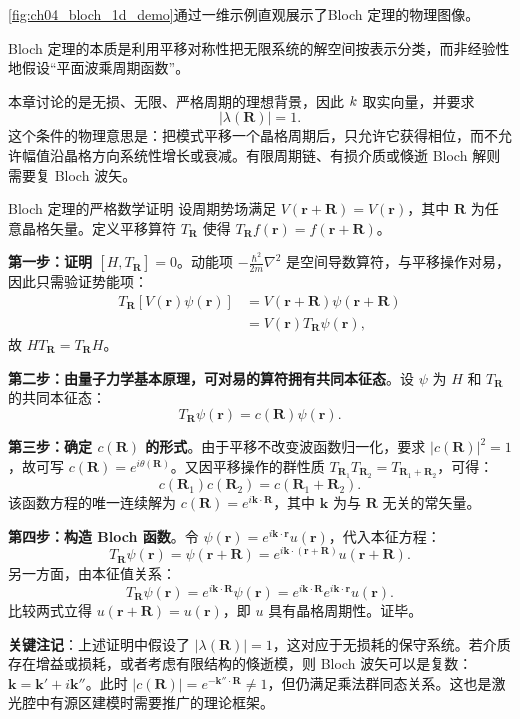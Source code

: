\cref{fig:ch04_bloch_1d_demo}通过一维示例直观展示了Bloch 定理的物理图像。

Bloch 定理的本质是利用平移对称性把无限系统的解空间按表示分类，而非经验性地假设“平面波乘周期函数”。

本章讨论的是无损、无限、严格周期的理想背景，因此 $k$ 取实向量，并要求
\[
|\lambda(\bm{R})|=1.
\]
这个条件的物理意思是：把模式平移一个晶格周期后，只允许它获得相位，而不允许幅值沿晶格方向系统性增长或衰减。有限周期链、有损介质或倏逝 Bloch 解则需要复 Bloch 波矢。

\begin{MathematicalFoundationBox}{Bloch 定理的严格数学证明}
设周期势场满足 $V(\mathbf{r}+\mathbf{R})=V(\mathbf{r})$，其中 $\mathbf{R}$ 为任意晶格矢量。定义平移算符 $T_\mathbf{R}$ 使得 $T_\mathbf{R}f(\mathbf{r}) = f(\mathbf{r}+\mathbf{R})$。

\textbf{第一步：证明 $[H, T_\mathbf{R}] = 0$}。动能项 $-\frac{\hbar^2}{2m}\nabla^2$ 是空间导数算符，与平移操作对易，因此只需验证势能项：
\begin{align*}
T_\mathbf{R}[V(\mathbf{r})\psi(\mathbf{r})] &= V(\mathbf{r}+\mathbf{R})\psi(\mathbf{r}+\mathbf{R}) \\
&= V(\mathbf{r})T_\mathbf{R}\psi(\mathbf{r}),
\end{align*}
故 $HT_\mathbf{R} = T_\mathbf{R}H$。

\textbf{第二步：由量子力学基本原理，可对易的算符拥有共同本征态}。设 $\psi$ 为 $H$ 和 $T_\mathbf{R}$ 的共同本征态：
$$T_\mathbf{R}\psi(\mathbf{r}) = c(\mathbf{R})\psi(\mathbf{r}).$$

\textbf{第三步：确定 $c(\mathbf{R})$ 的形式}。由于平移不改变波函数归一化，要求 $|c(\mathbf{R})|^2=1$，故可写 $c(\mathbf{R})=e^{i\theta(\mathbf{R})}$。又因平移操作的群性质 $T_{\mathbf{R}_1}T_{\mathbf{R}_2}=T_{\mathbf{R}_1+\mathbf{R}_2}$，可得：
$$c(\mathbf{R}_1)c(\mathbf{R}_2) = c(\mathbf{R}_1+\mathbf{R}_2).$$
该函数方程的唯一连续解为 $c(\mathbf{R}) = e^{i\mathbf{k}\cdot\mathbf{R}}$，其中 $\mathbf{k}$ 为与 $\mathbf{R}$ 无关的常矢量。

\textbf{第四步：构造 Bloch 函数}。令 $\psi(\mathbf{r}) = e^{i\mathbf{k}\cdot\mathbf{r}}u(\mathbf{r})$，代入本征方程：
$$T_\mathbf{R}\psi(\mathbf{r}) = \psi(\mathbf{r}+\mathbf{R}) = e^{i\mathbf{k}\cdot(\mathbf{r}+\mathbf{R})}u(\mathbf{r}+\mathbf{R}).$$
另一方面，由本征值关系：
$$T_\mathbf{R}\psi(\mathbf{r}) = e^{i\mathbf{k}\cdot\mathbf{R}}\psi(\mathbf{r}) = e^{i\mathbf{k}\cdot\mathbf{R}}e^{i\mathbf{k}\cdot\mathbf{r}}u(\mathbf{r}).$$
比较两式立得 $u(\mathbf{r}+\mathbf{R})=u(\mathbf{r})$，即 $u$ 具有晶格周期性。证毕。

\textbf{关键注记}：上述证明中假设了 $|\lambda(\mathbf{R})|=1$，这对应于无损耗的保守系统。若介质存在增益或损耗，或者考虑有限结构的倏逝模，则 Bloch 波矢可以是复数：$\mathbf{k} = \mathbf{k}' + i\mathbf{k}''$。此时 $|c(\mathbf{R})| = e^{-\mathbf{k}''\cdot\mathbf{R}} \neq 1$，但仍满足乘法群同态关系。这也是激光腔中有源区建模时需要推广的理论框架。
\end{MathematicalFoundationBox}

